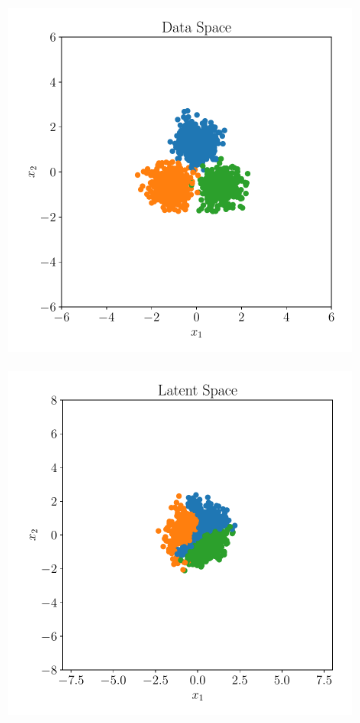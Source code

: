 \begin{figure}[htpb]
    \centering
    \begin{subfigure}[]{0.4\textwidth}
        \centering
    \includegraphics[width=\linewidth]{figures/toy_example/gaussian_mixture/toy_data.pdf}
        \caption{}
        \label{fig:}
    \end{subfigure}
    \begin{subfigure}[]{0.4\textwidth}
        \centering
    \includegraphics[width=\linewidth]{figures/toy_example/gaussian_mixture/latent_space.pdf}

\end{subfigure}
\end{figure}
